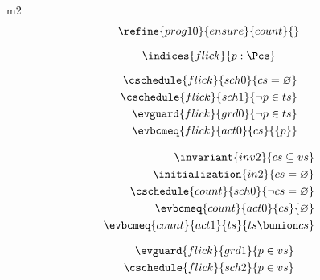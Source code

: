 \documentclass{article}
\begin{document}
\begin{machine}{m2}
\begin{align*}
	\refine{prog10}{ensure}{count}{} %
\end{align*}


\[ \indices{flick}{p : \Pcs} \]

\begin{align}
	\cschedule{flick}{sch0}{ cs = \emptyset } \\
	\cschedule{flick}{sch1}{ \neg p \in ts } \\
	\evguard{flick}{grd0}{ \neg p \in ts } \\
	\evbcmeq{flick}{act0}{cs}{ \{ p \} }
\end{align}





\begin{align}
	\invariant{inv2}{cs \subseteq vs} \\
	\initialization{in2}{ cs = \emptyset } \\
	\cschedule{count}{sch0}{ \neg cs = \emptyset } \\
	\evbcmeq{count}{act0}{cs}{\emptyset} \\
	\evbcmeq{count}{act1}{ts}{ ts \bunion cs }
\end{align}



\begin{align*}
	\evguard{flick}{grd1}{p \in vs} \\
	\cschedule{flick}{sch2}{p \in vs}
\end{align*}



\end{machine}
\end{document}
